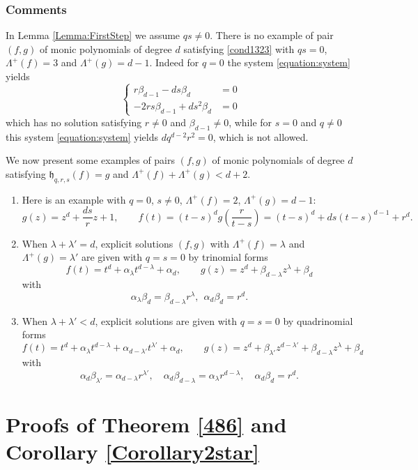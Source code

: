 \documentclass[10pt]{article}
\theoremstyle{definition}
\numberwithin{equation}{section}
\begin{document}
\subsubsection{Comments}

In Lemma \ref{Lemma:FirstStep} we assume $qs\not=0$. 
There is no example of pair $(f,g)$ of monic polynomials of degree $d$ satisfying \eqref{cond1323}
with $qs=0$, $\Lambda^+(f)=3$ and $\Lambda^+(g)=d-1$. 
Indeed for $q=0$ the system \eqref{equation:system} yields
\[
\left\{
\begin{matrix}
r\beta_{d-1}-ds\beta_d&=0
\\
-2rs\beta_{d-1}+ds^2\beta_d&=0
\end{matrix}
\right.
\]
which has no solution satisfying $r\not=0$ and $\beta_{d-1}\not=0$, while for $s=0$ and $q\not=0$ this system \eqref{equation:system} yields $dq^{d-2}r^2=0$, which is not allowed.

We now present some examples of pairs $(f,g)$ of monic polynomials of degree $d$ satisfying $\mathfrak h_{q,r,s} (f) = g$ and $\Lambda^+(f) +\Lambda^+ (g)<d+2$.

\begin{enumerate}
\item Here is an example with $q=0$, $s\not=0$, $\Lambda^+ (f) =2$, $\Lambda^+ (g) =d-1$:
\[
g(z)=z^d+\frac {ds}r z+1,\qquad f(t)=(t-s)^d g\left(\frac r {t-s}\right)=(t-s)^d+ds(t-s)^{d-1}+r^d.
\]

\item When $\lambda+\lambda'=d$, explicit solutions $(f,g)$ with $\Lambda^+(f)=\lambda$ and $\Lambda^+(g)=\lambda'$ are given with $q=s=0$ by trinomial forms
\[
f(t)=t^d+ \alpha_\lambda t^{d-\lambda}+\alpha_d,
\qquad
g(z)=z^d+\beta_{d-\lambda}z^\lambda +\beta_d
\]
with
\[
\alpha_\lambda \beta_d = \beta_{d-\lambda}r^\lambda, \ \ \alpha_d \beta_d = r^d.
\]
\item When $\lambda+\lambda'<d$, explicit solutions are given with $q=s=0$ by quadrinomial forms
\[
f(t)=t^d+ \alpha_\lambda t^{d-\lambda}+\alpha_{d-\lambda'} t^{\lambda'}+\alpha_d,
\qquad
g(z)=z^d+\beta_{\lambda'}z^{d-\lambda'} +\beta_{d-\lambda}z^\lambda +\beta_d
\]
with
\[
\alpha_d\beta_{\lambda'}=\alpha_{d-\lambda} r^{\lambda'}, \quad
\alpha_d\beta_{d-\lambda}=\alpha_{\lambda} r^{d-\lambda}, \quad \alpha_d\beta_d=r^d.
\]
 
 \end{enumerate} 
 
 \section{Proofs of Theorem \ref{486} and Corollary \ref{Corollary2star}}\label{Proofs486et2star}
 
\end{document}
